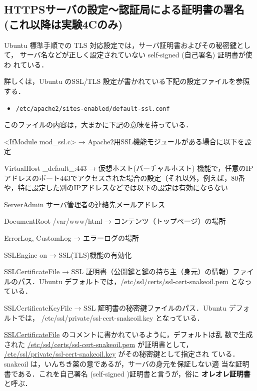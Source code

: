 \subsection{HTTPSサーバの設定～認証局による証明書の署名 (これ以降は実験4Cのみ)}

Ubuntu 標準手順での TLS 対応設定では，サーバ証明書およびその秘密鍵として，
サーバ名などが正しく設定されていない self-signed (自己署名) 証明書が使わ
れている．


詳しくは，Ubuntu のSSL/TLS 設定が書かれている下記の設定ファイルを参照する．

\begin{itemize}
    \item \texttt{/etc/apache2/sites-enabled/default-ssl.conf}
\end{itemize}

このファイルの内容は，大まかに下記の意味を持っている．

\begin{cli}
<IfModule mod_ssl.c>
→ Apache2用SSL機能モジュールがある場合に以下を設定

VirtualHost _default_:443
→ 仮想ホスト(バーチャルホスト) 機能で，任意のIPアドレスのポート443でアクセスされた場合の設定（それ以外，例えば，80番や，特に設定した別のIPアドレスなどでは以下の設定は有効にならない

ServerAdmin サーバ管理者の連絡先メールアドレス

DocumentRoot /var/www/html
→ コンテンツ（トップページ）の場所

ErrorLog, CustomLog
→ エラーログの場所

SSLEngine on
→ SSL(TLS)機能の有効化

SSLCertificateFile
→ SSL 証明書（公開鍵と鍵の持ち主（身元）の情報）ファイルのパス．Ubuntu デフォルトでは，/etc/ssl/certs/ssl-cert-snakeoil.pem となっている．

SSLCertificateKeyFile
→ SSL 証明書の秘密鍵ファイルのパス．Ubuntu デフォルトでは，
/etc/ssl/private/ssl-cert-snakeoil.key となっている．

\end{cli}

\url{SSLCertificateFile} のコメントに書かれているように，デフォルトは乱
数で生成された \url{/etc/ssl/certs/ssl-cert-snakeoil.pem} が証明書として，
\url{/etc/ssl/private/ssl-cert-snakeoil.key} がその秘密鍵として指定され
ている．snakeoil は，いんちき薬の意であるが，サーバの身元を保証しない適
当な証明書である．これを自己署名 (self-signed )証明書と言うが，俗に
\textbf{オレオレ証明書}と呼ぶ．

